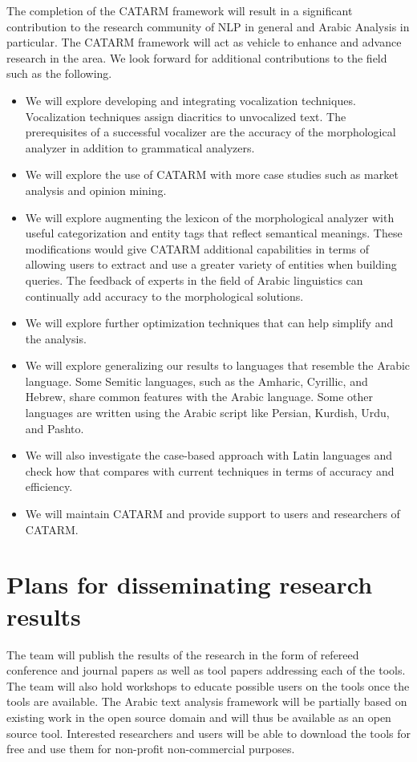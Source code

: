 \documentclass[12pt]{article}
\begin{document}
The completion of the CATARM framework will result in a 
significant contribution to the research community of 
NLP in general and Arabic Analysis in particular. 
The CATARM framework will act as vehicle to enhance and advance 
research in the area. 
We look forward for additional contributions to the field 
such as the following.
\begin{itemize}
\item We will explore developing and integrating vocalization
techniques. 
Vocalization techniques assign diacritics to unvocalized text. 
The prerequisites of a successful vocalizer are the accuracy of 
the morphological analyzer in addition to grammatical analyzers. 
\item We will explore the use of CATARM with more case studies
such as market analysis and opinion mining.
\item We will explore augmenting the lexicon of the
morphological analyzer with useful categorization and entity 
tags that reflect semantical meanings. 
These modifications would give CATARM additional capabilities in 
terms of allowing users to extract and use a greater variety of 
entities when building queries. 
The feedback of experts in the field of Arabic linguistics can 
continually add accuracy to the morphological solutions.  
\item We will explore further optimization techniques
that can help simplify and the analysis. 
\item We will explore generalizing our results to languages 
that resemble the Arabic language. 
Some Semitic languages, such as the Amharic, Cyrillic, and Hebrew,
share common features with the Arabic 
language. Some other languages are written using the 
Arabic script like Persian, Kurdish, Urdu, and Pashto. 
\item We will also investigate the case-based approach with
Latin languages and check how that compares with current techniques
in terms of accuracy and efficiency.
\item We will maintain CATARM and provide support to users and 
researchers of CATARM.
\end{itemize}


\section{Plans for disseminating research results}
\label{s:dissem}

The team will publish the results of the research in the form 
of refereed conference and journal papers as well as tool papers 
addressing each of the tools. 
The team will also hold workshops to educate possible users on the 
tools once the tools are available.
The Arabic text analysis framework will be partially based on 
existing work in the open source domain and will thus be available 
as an open source tool. 
Interested researchers and users will be able to download the 
tools for free and use them for non-profit non-commercial 
purposes.  

\pagebreak
%
%

%
{\small
  
}
\end{document}
